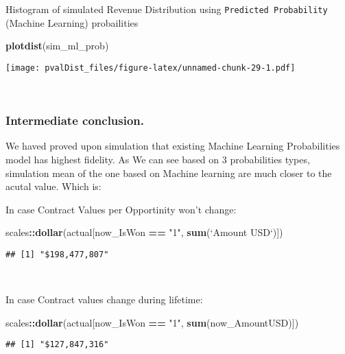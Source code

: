 \documentclass[]{article}
\newenvironment{Shaded}{\begin{snugshade}}{\end{snugshade}}
\newcommand{\DataTypeTok}[1]{\textcolor[rgb]{0.13,0.29,0.53}{#1}}
\newcommand{\KeywordTok}[1]{\textcolor[rgb]{0.13,0.29,0.53}{\textbf{#1}}}
\newcommand{\NormalTok}[1]{#1}
\newcommand{\OperatorTok}[1]{\textcolor[rgb]{0.81,0.36,0.00}{\textbf{#1}}}
\newcommand{\StringTok}[1]{\textcolor[rgb]{0.31,0.60,0.02}{#1}}
\begin{document}
Histogram of simulated Revenue Distribution using
\texttt{Predicted\ Probability} (Machine Learning) probailities

\begin{Shaded}
\begin{Highlighting}[]
\KeywordTok{plotdist}\NormalTok{(sim_ml_prob)}
\end{Highlighting}
\end{Shaded}

\texttt{[image: pvalDist\_files/figure-latex/unnamed-chunk-29-1.pdf]}

~

\hypertarget{intermediate-conclusion.}{%
\subsubsection{Intermediate
conclusion.}\label{intermediate-conclusion.}}

We haved proved upon simulation that existing Machine Learning
Probabilities model has highest fidelity. As We can see based on 3
probabilities types, simulation mean of the one based on Machine
learning are much closer to the acutal value. Which is:

In case Contract Values per Opportinity won't change:

\begin{Shaded}
\begin{Highlighting}[]
\NormalTok{scales}\OperatorTok{::}\KeywordTok{dollar}\NormalTok{(actual[now_IsWon }\OperatorTok{==}\StringTok{ "1"}\NormalTok{, }\KeywordTok{sum}\NormalTok{(}\StringTok{`}\DataTypeTok{Amount USD}\StringTok{`}\NormalTok{)])}
\end{Highlighting}
\end{Shaded}

\begin{verbatim}
## [1] "$198,477,807"
\end{verbatim}

~

In case Contract values change during lifetime:

\begin{Shaded}
\begin{Highlighting}[]
\NormalTok{scales}\OperatorTok{::}\KeywordTok{dollar}\NormalTok{(actual[now_IsWon }\OperatorTok{==}\StringTok{ "1"}\NormalTok{, }\KeywordTok{sum}\NormalTok{(now_AmountUSD)])}
\end{Highlighting}
\end{Shaded}

\begin{verbatim}
## [1] "$127,847,316"
\end{verbatim}
\end{document}

